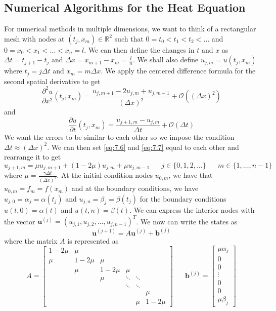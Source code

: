 \documentclass{article}
\newcommand{\R}{\mathbb{R}}
\newcommand{\pd}[2]{\frac{\partial #1}{\partial #2}}
\newcommand{\pdt}[2]{\frac{\partial ^2 #1}{\partial #2 ^2}}
\newcommand{\vb}[1]{\mathbf{ #1}}
\newcommand{\twen}{\hspace{20pt}}
\numberwithin{equation}{section}
\begin{document}
\subsection{Numerical Algorithms for the Heat Equation}
For numerical methods in multiple dimensions, we want to think of a rectangular mesh with nodes at $(t_j,x_m)\in \R^2$ such that $0=t_0<t_1<t_2<\ldots$ and $0=x_0<x_1<\ldots<x_n=l$. We can then define the changes in $t$ and $x$ as $\Delta t=t_{j+1}-t_j$ and $\Delta x=x_{m+1}-x_{m}=\frac{l}{n}$. We shall also define $u_{j,m}=u(t_j,x_m)$ where $t_j=j\Delta t$ and $x_m=m\Delta x$. We apply the centered difference formula for the second spatial derivative to get 
\begin{equation}
    \pdt{u}{x}(t_j,x_m)=\frac{u_{j,m+1}-2u_{j,m}+u_{j,m-1}}{(\Delta x)^2}+\mathcal{O}((\Delta x)^2) \label{eq:7.6}
\end{equation}
and 
\begin{equation}
    \pd{u}{t}(t_j,x_m) = \frac{u_{j+1,m}-u_{j,m}}{\Delta t} +\mathcal{O}(\Delta t) \label{eq:7.7}
\end{equation}
We want the errors to be similar to each other so we impose the condition $\Delta t\approx (\Delta x)^2$. We can then set \eqref{eq:7.6} and \eqref{eq:7.7} equal to each other and rearrange it to get 
\begin{equation*}
    u_{j+1,m} = \mu u_{j,m+1} + (1-2\mu)u_{j,m}+\mu u_{j,m-1} \twen j\in \{0,1,2,\ldots \} \twen m\in \{1,\ldots,n-1\}
\end{equation*}
where $\mu = \frac{\gamma \Delta t}{(\Delta x)^2}$. At the initial condition nodes $u_{0,m}$, we have that $u_{0,m}=f_m=f(x_m)$ and at the boundary conditions, we have $u_{j,0} = \alpha_j=\alpha(t_j)$ and $u_{j,n}=\beta_j=\beta(t_j)$ for the boundary conditions $u(t,0)=\alpha (t)$ and $u(t,n)=\beta (t)$. We can express the interior nodes with the vector $\vb{u}^{(j)} =(u_{j,1},u_{j,2},\ldots, u_{j,n-1})^T$. We now can write the states as 
\begin{equation}
    \vb{u}^{(j+1)} = A\vb{u}^{(j)}+\vb{b}^{(j)}
\end{equation}
where the matrix $A$ is represented as 
\begin{equation*}
    A=\begin{bmatrix}
        1-2\mu&\mu\\\mu&1-2\mu&\mu \\ &\mu&1-2\mu&\mu\\&&\mu&\ddots&\ddots\\
        &&&\ddots&\ddots\\&&&&&\mu\\ &&&&\mu&1-2\mu
    \end{bmatrix} 
    \twen \vb{b}^{(j)} = \begin{bmatrix}
        \mu \alpha_j\\0\\0\\ \vdots \\0\\0\\ \mu\beta_j
    \end{bmatrix}
\end{equation*}
\end{document}
